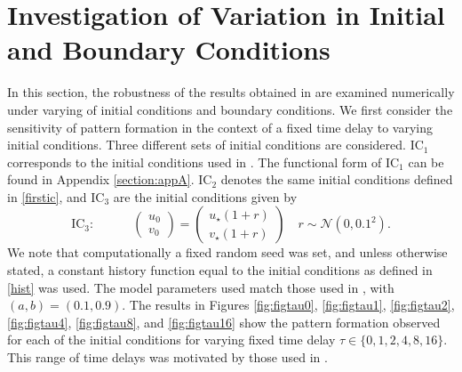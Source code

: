 \section{Investigation of Variation in Initial and Boundary Conditions}
In this section, the robustness of the results obtained in \cite{gaffmonk} are examined numerically under varying of initial conditions and boundary conditions. We first consider the sensitivity of pattern formation in the context of a fixed time delay to varying initial conditions. Three different sets of initial conditions are considered. $\text{IC}_1$ corresponds to the initial conditions used in \cite{gaffmonk}. The functional form of $\text{IC}_1$ can be found in Appendix \ref{section:appA}. $\text{IC}_2$ denotes the same initial conditions defined in \eqref{firstic}, and $\text{IC}_3$ are the initial conditions given by
\begin{equation}\label{ic3}
\text{IC}_3:\quad\quad\quad\begin{pmatrix}u_0\\v_0\end{pmatrix}=\begin{pmatrix}u_\star(1+r)\\v_\star(1+r)\end{pmatrix}\quad r\sim\mathcal{N}\left(0,0.1^2\right).
\end{equation}
We note that computationally a fixed random seed was set, and unless otherwise stated, a constant history function equal to the initial conditions as defined in \eqref{hist} was used. The model parameters used match those used in \cite{gaffmonk}, with $(a,b)=(0.1,0.9)$. The results in Figures \ref{fig:figtau0}, \ref{fig:figtau1}, \ref{fig:figtau2}, \ref{fig:figtau4}, \ref{fig:figtau8}, and \ref{fig:figtau16} show the pattern formation observed for each of the initial conditions for varying fixed time delay $\tau\in\{0,1,2,4,8,16 \}$. This range of time delays was motivated by those used in \cite{gaffmonk}.

